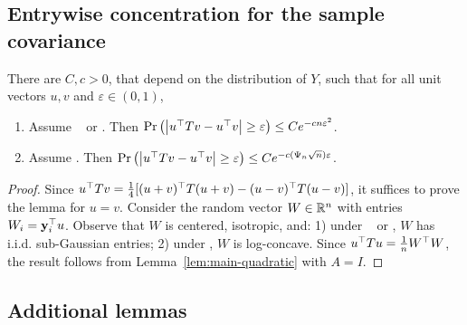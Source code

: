 \documentclass[times,sort&compress,3p]{elsarticle}
\begin{document}
\subsection{Entrywise concentration for the sample covariance}

\begin{lemma}\label{lem:sc-entrywise}
    There are $C,c>0$, that depend on the distribution of $Y$, such that for all unit vectors $u,v$ and $\varepsilon\in(0,1)$,
\begin{enumerate}
    \item Assume \AssumIndep~ or \AssumCCPSB. Then $\Pr\left( \left| u^\top Tv - u^\top v \right|\ge \varepsilon\right) \le Ce^{-cn\varepsilon^2}$.
    \item Assume \AssumLC. Then $\Pr\left( \left| u^\top Tv - u^\top v \right|\ge \varepsilon\right) \le Ce^{-c(\Psi_n\sqrt{n})\varepsilon}$.
\end{enumerate}
\end{lemma}
\begin{proof}
    Since $u^\top T v =
    \frac14[
    (u+v)^\top T (u+v) - (u-v)^\top  T (u-v)]$, it suffices to prove the lemma for $u=v$. Consider the random vector $W\in \mathbb{R}^n$ with entries $W_i={\bf y}_i^\top u$. Observe that $W$ is centered, isotropic, and: 1) under  \AssumIndep~ or \AssumCCPSB, $W$ has i.i.d. sub-Gaussian entries; 2) under \AssumLC, $W$ is log-concave. Since $u^\top T u = \frac{1}{n}W^\top W$, the
    result follows from Lemma~\ref{lem:main-quadratic} with $A=I$. 
\end{proof}

\subsection{Additional lemmas}

\end{document}
